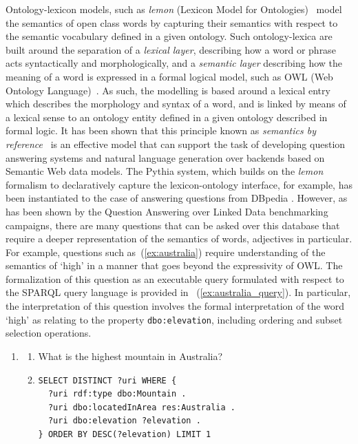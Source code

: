 \documentclass[11pt]{article}
\begin{document}
Ontology-lexicon models, such as \emph{lemon} (Lexicon Model for Ontologies)~
\cite{mccrae2012inter} model the semantics of open class words by capturing their semantics with respect to the semantic vocabulary defined in a given ontology. Such 
ontology-lexica are built around the separation of a \emph{lexical layer}, describing 
how a word or phrase acts syntactically and morphologically, and a \emph{semantic layer} 
describing how the meaning of a word is expressed in a formal logical model, 
such as OWL (Web Ontology Language)~\cite{mcguinness2004owl}. 
As such, the modelling is based around a lexical entry which describes the morphology
and syntax of a word, and is linked by means of a lexical sense to an ontology entity
defined in a given ontology described in formal logic.
It has been 
shown that this principle known as \emph{semantics by reference}~
\cite{buitelaar2010ontology} is an effective model that can support the task of developing
question answering systems \cite{unger2011pythia} and natural language 
generation \cite{cimiano2013exploiting} over backends based on Semantic Web data models.
The Pythia system, which builds on the \emph{lemon} formalism to declaratively capture the lexicon-ontology interface, for example, has been instantiated to the case of answering questions from DBpedia \cite{unger2011pythia}.
However, as has been 
shown by the Question Answering over Linked Data \cite[QALD]{lopez2013evaluating}
benchmarking campaigns, there are many questions that can be asked over this database that require 
a deeper representation of the semantics of words, adjectives in particular. For example, 
questions such as~(\ref{ex:australia}) require understanding of the semantics of `high' in a manner that goes beyond the expressivity of OWL. The formalization of this question as an executable query formulated with respect to the SPARQL query language is provided in ~(\ref{ex:australia_query}). 
In particular, the interpretation of this question involves the formal interpretation of the word `high' as relating to the property {\tt dbo:elevation}, including ordering 
and subset selection operations.

\begin{enumerate}
\item \begin{enumerate} 
\item What is the highest mountain in Australia? \label{ex:australia}
\item \begin{small}\begin{small}\begin{verbatim}
SELECT DISTINCT ?uri WHERE { 
  ?uri rdf:type dbo:Mountain . 
  ?uri dbo:locatedInArea res:Australia . 
  ?uri dbo:elevation ?elevation . 
} ORDER BY DESC(?elevation) LIMIT 1
\end{verbatim}\end{small} \end{small}
\label{ex:australia_query}
\end{enumerate}
\end{enumerate}
\end{document}
